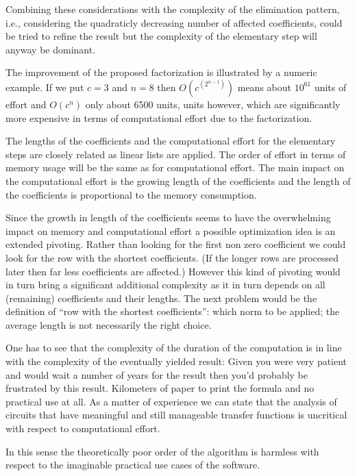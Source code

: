 Combining these considerations with the complexity of the elimination
pattern, i.e., considering the quadraticly decreasing number of affected
coefficients, could be tried to refine the result but the complexity of
the elementary step will anyway be dominant.

The improvement of the proposed factorization is illustrated by a numeric
example. If we put $c=3$ and $n=8$ then $O(c^{(2^{n-1})})$ means about
$10^{61}$ units of effort and $O(c^n)$ only about 6500 units, units
however, which are significantly more expensive in terms of computational
effort due to the factorization.

The lengths of the coefficients and the computational effort for the
elementary steps are closely related as linear lists are applied. The
order of effort in terms of memory usage will be the same as for
computational effort. The main impact on the computational effort is the
growing length of the coefficients and the length of the coefficients is
proportional to the memory consumption.

Since the growth in length of the coefficients seems to have the
overwhelming impact on memory and computational effort a possible
optimization idea is an extended pivoting. Rather than looking for the
first non zero coefficient we could look for the row with the shortest
coefficients. (If the longer rows are processed later then far less
coefficients are affected.) However this kind of pivoting would in turn
bring a significant additional complexity as it in turn depends on all
(remaining) coefficients and their lengths. The next problem would be the
definition of ``row with the shortest coefficients'': which norm to be
applied; the average length is not necessarily the right choice.

One has to see that the complexity of the duration of the computation is
in line with the complexity of the eventually yielded result: Given you
were very patient and would wait a number of years for the result
then you'd probably be frustrated by this result. Kilometers of paper to
print the formula and no practical use at all. As a matter of experience
we can state that the analysis of circuits that have meaningful and still
manageable transfer functions is uncritical with respect to computational
effort.

In this sense the theoretically poor order of the algorithm is harmless
with respect to the imaginable practical use cases of the software.


